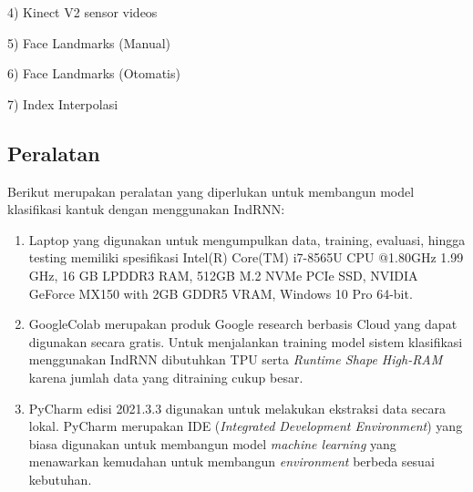 4)	Kinect V2 sensor videos

5)	Face Landmarks (Manual)

6)	Face Landmarks (Otomatis)

7)	Index Interpolasi

\subsection{Peralatan}

Berikut merupakan peralatan yang diperlukan untuk membangun model klasifikasi kantuk dengan menggunakan IndRNN:

\begin{enumerate}[nolistsep]
      \item Laptop yang digunakan untuk mengumpulkan data, training, evaluasi, hingga testing memiliki spesifikasi Intel(R)
            Core(TM) i7-8565U CPU @1.80GHz 1.99 GHz, 16 GB LPDDR3 RAM, 512GB M.2 NVMe PCIe SSD, NVIDIA GeForce MX150 with
            2GB GDDR5 VRAM, Windows 10 Pro 64-bit.
      \item GoogleColab merupakan produk Google research berbasis Cloud yang dapat digunakan secara gratis. Untuk menjalankan
            training model sistem klasifikasi menggunakan IndRNN dibutuhkan TPU serta \emph{Runtime Shape High-RAM} karena jumlah
            data yang ditraining cukup besar.
      \item PyCharm edisi 2021.3.3 digunakan untuk melakukan ekstraksi data secara lokal. PyCharm merupakan IDE (\emph{Integrated Development Environment})
            yang biasa digunakan untuk membangun model \emph{machine learning} yang menawarkan kemudahan untuk membangun \emph{environment} berbeda sesuai
            kebutuhan.

\end{enumerate}

